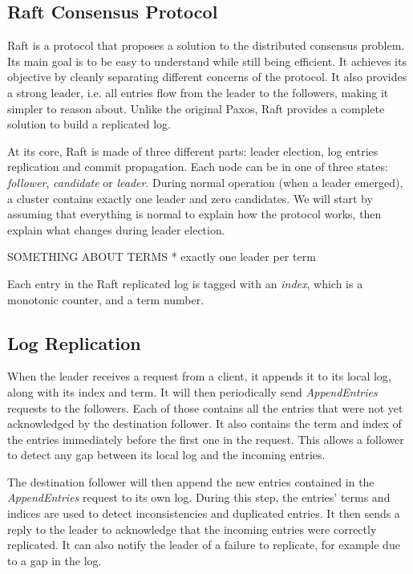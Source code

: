 \subsection{Raft Consensus Protocol}

Raft\cite{raft} is a protocol that proposes a solution to the distributed consensus problem.
Its main goal is to be easy to understand while still being efficient.
It achieves its objective by cleanly separating different concerns of the protocol.
It also provides a strong leader, i.e. all entries flow from the leader to the followers, making it simpler to reason about.
Unlike the original Paxos, Raft provides a complete solution to build a replicated log.

At its core, Raft is made of three different parts: leader election, log entries replication and commit propagation.
Each node can be in one of three states: \emph{follower}, \emph{candidate} or \emph{leader}.
During normal operation (when a leader emerged), a cluster contains exactly one leader and zero candidates.
We will start by assuming that everything is normal to explain how the protocol works, then explain what changes during leader election.

SOMETHING ABOUT TERMS
* exactly one leader per term

Each entry in the Raft replicated log is tagged with an \emph{index}, which is a monotonic counter, and a term number.

\subsection{Log Replication}

When the leader receives a request from a client, it appends it to its local log, along with its index and term.
It will then periodically send \emph{AppendEntries} requests to the followers.
Each of those contains all the entries that were not yet acknowledged by the destination follower.
It also contains the term and index of the entries immediately before the first one in the request.
This allows a follower to detect any gap between its local log and the incoming entries.

The destination follower will then append the new entries contained in the \emph{AppendEntries} request to its own log.
During this step, the entries' terms and indices are used to detect inconsistencies and duplicated entries.
It then sends a reply to the leader to acknowledge that the incoming entries were correctly replicated.
It can also notify the leader of a failure to replicate, for example due to a gap in the log.

